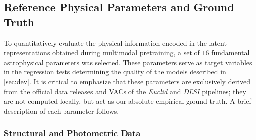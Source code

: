\subsection{Reference Physical Parameters and Ground Truth} \label{sec:dat:params}

To quantitatively evaluate the physical information encoded in the latent representations obtained during multimodal pretraining, a set of $16$ fundamental astrophysical parameters was selected. These parameters serve as target variables in the regression tests determining the quality of the models described in \cref{sec:dev}. It is critical to emphasize that these parameters are exclusively derived from the official data releases and \glspl{VAC} of the \textit{Euclid} and \textit{\gls{DESI}} pipelines; they are not computed locally, but act as our absolute empirical ground truth. A brief description of each parameter follows.

\subsubsection{Structural and Photometric Data}

